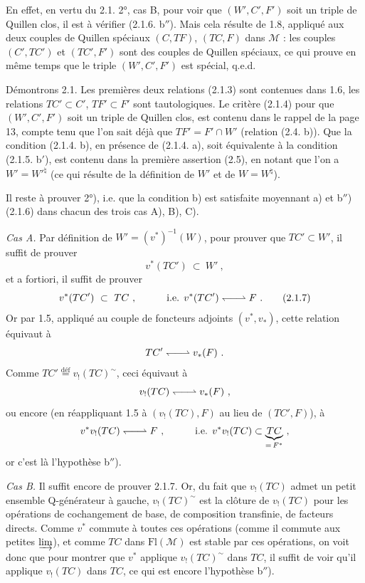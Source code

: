 \documentclass[11pt]{article}
\newcommand{\printedpage}[1]{\marginpar{\footnotesize p.~#1}}
\newcommand{\msp}[1]{\marginpar{\footnotesize [#1]}}
\newcommand{\M}{\mathcal{M}}
\newcommand{\Fl}{\mathrm{Fl}}
\newcommand{\harp}{\mathrel{\leftharpoondown\joinrel\relbar\joinrel\rightharpoonup}}
\begin{document}
\printedpage{11}

\msp{page 17}
En effet, en vertu du 2.1. 2°, cas B, pour voir que $(W',C',F')$ soit un triple de Quillen clos, il est à vérifier (2.1.6. b$''$). Mais cela résulte de 1.8, appliqué aux deux couples de Quillen spéciaux $(C,TF)$, $(TC,F)$ dans $\M$ : les couples $(C',TC')$ et $(TC',F')$ sont des couples de Quillen spéciaux, ce qui prouve en même temps que le triple $(W',C',F')$ est spécial, q.e.d. %

Démontrons 2.1. Les premières deux relations (2.1.3) sont contenues dans 1.6, les relations $TC' \subset C'$, $TF' \subset F'$ sont tautologiques. Le critère (2.1.4) pour que $(W',C',F')$ soit un triple de Quillen clos, est contenu dans le rappel de la page 13, compte tenu que l'on sait déjà que $TF' = F' \cap W'$ (relation (2.4. b)). Que la condition (2.1.4. b), en présence de (2.1.4. a), soit équivalente à la condition (2.1.5. b$'$), est contenu dans la première assertion (2.5), en notant que l'on a $W' = W'^{\natural}$ (ce qui résulte de la définition de $W'$ et de $W = W^{\natural}$).

Il reste à prouver 2°), i.e. que la condition b) est satisfaite moyennant a) et b$''$) (2.1.6) dans chacun des trois cas A), B), C).

\textit{Cas A.} Par définition de $W' = (v^*)^{-1}(W)$, pour prouver que $TC' \subset W'$, il suffit de prouver
\[
v^*(TC')\ \subset\ W'\ ,  %
\]
et a fortiori, il suffit de prouver
\[
v^*(TC')\ \subset\ TC\ ,\qquad\quad \text{i.e. } v^*(TC') \harp F\ .
\tag*{(2.1.7)} %
\]
Or par 1.5, appliqué au couple de foncteurs
\msp{page 18}
adjoints $(v^*,v_*)$, cette relation équivaut à
\[
TC' \harp v_*(F)\ .
\]
Comme $TC' \overset{\text{déf}}{=} v_!(TC)^{\sim}$, ceci équivaut à
\[
v_!(TC) \harp v_*(F)\ ,
\]
ou encore (en réappliquant 1.5 à $(v_!(TC),F)$ au lieu de $(TC',F)$), à
\[
v^*v_!(TC) \harp F\ ,\qquad\quad \text{i.e. } v^*v_!(TC) \subset \underbrace{TC}_{=\,F^*}\ ,
\]
or c'est là l'hypothèse b$''$).

\textit{Cas B.} Il suffit encore de prouver 2.1.7. Or, du fait que $v_!(TC)$ admet un petit ensemble Q-générateur à gauche, $v_!(TC)^{\sim}$ est la clôture de $v_!(TC)$ pour les opérations de cochangement de base, de composition transfinie, de facteurs directs. Comme $v^*$ commute à toutes ces opérations (comme il commute aux petites $\varinjlim$), et comme $TC$ dans $\Fl(\M)$ est stable par ces opérations, on voit donc que pour montrer que $v^*$ applique $v_!(TC)^{\sim}$ dans $TC$, il suffit de voir qu'il applique $v_!(TC)$ dans $TC$, ce qui est encore l'hypothèse b$''$).
\end{document}
